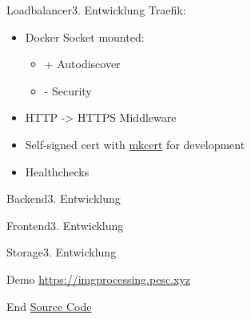 \documentclass[aspectratio=169,20pt]{beamer}
\begin{document}
\begin{frame}{Loadbalancer}{3. Entwicklung}
    Traefik:
	\begin{itemize}
		\item{Docker Socket mounted:}
		\begin{itemize}
			\item{+ Autodiscover}
			\item{- Security}
		\end{itemize}
		\item{HTTP -> HTTPS Middleware}
        \item{Self-signed cert with \href{https://github.com/FiloSottile/mkcert}{mkcert} for development}
        \item{Healthchecks}
	\end{itemize}
\end{frame}

\begin{frame}{Backend}{3. Entwicklung}

\end{frame}

\begin{frame}{Frontend}{3. Entwicklung}

\end{frame}

\begin{frame}{Storage}{3. Entwicklung}

\end{frame}

\begin{frame}{Demo}{}
	\href{https://imgprocessing.pesc.xyz/}{https://imgprocessing.pesc.xyz}
\end{frame}

\begin{frame}{End}{}
	\href{https://github.com/imgProcessing/backend}{Source Code}
\end{frame}
\end{document}
